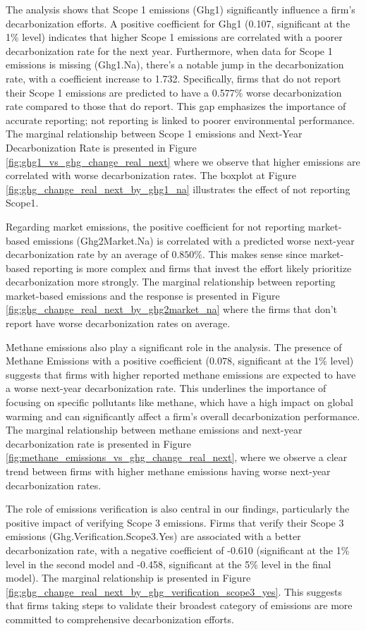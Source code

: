 The analysis shows that Scope 1 emissions (Ghg1) significantly influence a firm's decarbonization efforts. A positive coefficient for Ghg1 (0.107, significant at the 1\% level) indicates that higher Scope 1 emissions are correlated with a poorer decarbonization rate for the next year. Furthermore, when data for Scope 1 emissions is missing (Ghg1.Na), there's a notable jump in the decarbonization rate, with a coefficient increase to 1.732. Specifically, firms that do not report their Scope 1 emissions are predicted to have a 0.577\% worse decarbonization rate compared to those that do report. This gap emphasizes the importance of accurate reporting; not reporting is linked to poorer environmental performance. The marginal relationship between Scope 1 emissions and Next-Year Decarbonization Rate is presented in Figure \ref{fig:ghg1_vs_ghg_change_real_next} where we observe that higher emissions are correlated with worse decarbonization rates. The boxplot at Figure \ref{fig:ghg_change_real_next_by_ghg1_na} illustrates the effect of not reporting Scope1.


Regarding market emissions, the positive coefficient for not reporting market-based emissions (Ghg2Market.Na) is correlated with a predicted worse next-year decarbonization rate by an average of $0.850 \%$. This makes sense since market-based reporting is more complex and firms that invest the effort likely prioritize decarbonization more strongly. The marginal relationship between reporting market-based emissions and the response is presented in Figure \ref{fig:ghg_change_real_next_by_ghg2market_na} where the firms that don't report have worse decarbonization rates on average.
    

Methane emissions also play a significant role in the analysis. The presence of Methane Emissions with a positive coefficient ($0.078$, significant at the 1\% level) suggests that firms with higher reported methane emissions are expected to have a worse next-year decarbonization rate. This underlines the importance of focusing on specific pollutants like methane, which have a high impact on global warming and can significantly affect a firm's overall decarbonization performance. The marginal relationship between methane emissions and next-year decarbonization rate is presented in Figure \ref{fig:methane_emissions_vs_ghg_change_real_next}, where we observe a clear trend between firms with higher methane emissions having worse next-year decarbonization rates.
    


The role of emissions verification is also central in our findings, particularly the positive impact of verifying Scope 3 emissions. Firms that verify their Scope 3 emissions (Ghg.Verification.Scope3.Yes) are associated with a better decarbonization rate, with a negative coefficient of -0.610 (significant at the 1\% level in the second model and -0.458, significant at the 5\% level in the final model). The marginal relationship is presented in Figure \ref{fig:ghg_change_real_next_by_ghg_verification_scope3_yes}. This suggests that firms taking steps to validate their broadest category of emissions are more committed to comprehensive decarbonization efforts.


